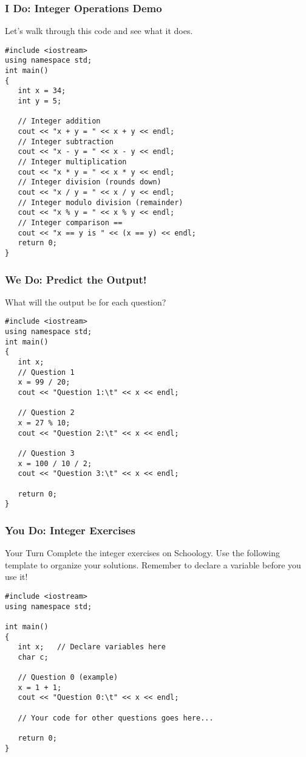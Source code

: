 \documentclass{beamer}
\begin{document}
\begin{frame}[fragile]
\frametitle{I Do: Integer Operations Demo}
Let's walk through this code and see what it does.
\begin{verbatim}
#include <iostream>
using namespace std;
int main()
{
   int x = 34;
   int y = 5;

   // Integer addition
   cout << "x + y = " << x + y << endl;
   // Integer subtraction
   cout << "x - y = " << x - y << endl;
   // Integer multiplication
   cout << "x * y = " << x * y << endl;
   // Integer division (rounds down)
   cout << "x / y = " << x / y << endl;
   // Integer modulo division (remainder)
   cout << "x % y = " << x % y << endl;
   // Integer comparison ==
   cout << "x == y is " << (x == y) << endl;
   return 0;
}
\end{verbatim}
\end{frame}

\begin{frame}[fragile]
\frametitle{We Do: Predict the Output!}
What will the output be for each question?
\begin{verbatim}
#include <iostream>
using namespace std;
int main()
{
   int x;
   // Question 1
   x = 99 / 20;
   cout << "Question 1:\t" << x << endl;

   // Question 2
   x = 27 % 10;
   cout << "Question 2:\t" << x << endl;

   // Question 3
   x = 100 / 10 / 2;
   cout << "Question 3:\t" << x << endl;

   return 0;
}
\end{verbatim}
\end{frame}

\begin{frame}[fragile]
\frametitle{You Do: Integer Exercises}
\begin{block}{Your Turn}
Complete the integer exercises on Schoology. Use the following template to organize your solutions. Remember to declare a variable before you use it!
\end{block}
\begin{verbatim}
#include <iostream>
using namespace std;

int main()
{
   int x;   // Declare variables here
   char c;

   // Question 0 (example)
   x = 1 + 1;
   cout << "Question 0:\t" << x << endl;

   // Your code for other questions goes here...

   return 0;
}
\end{verbatim}
\end{frame}
\end{document}
